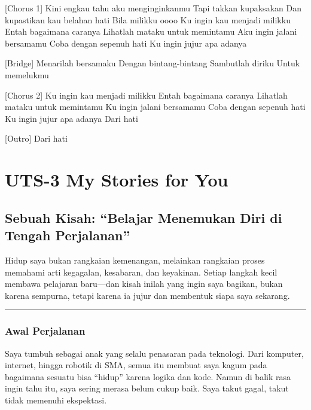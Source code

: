 \documentclass[
  letterpaper,
  DIV=11,
  numbers=noendperiod]{scrreprt}
\begin{document}
{[}Chorus 1{]} Kini engkau tahu aku menginginkanmu Tapi takkan
kupaksakan Dan kupastikan kau belahan hati Bila milikku oooo Ku ingin
kau menjadi milikku Entah bagaimana caranya Lihatlah mataku untuk
memintamu Aku ingin jalani bersamamu Coba dengan sepenuh hati Ku ingin
jujur apa adanya

{[}Bridge{]} Menarilah bersamaku Dengan bintang-bintang Sambutlah diriku
Untuk memelukmu

{[}Chorus 2{]} Ku ingin kau menjadi milikku Entah bagaimana caranya
Lihatlah mataku untuk memintamu Ku ingin jalani bersamamu Coba dengan
sepenuh hati Ku ingin jujur apa adanya Dari hati

{[}Outro{]} Dari hati


\chapter{UTS-3 My Stories for You}\label{uts-3-my-stories-for-you}

\section{\texorpdfstring{\textbf{Sebuah Kisah: ``Belajar Menemukan Diri
di Tengah
Perjalanan''}}{Sebuah Kisah: ``Belajar Menemukan Diri di Tengah Perjalanan''}}\label{sebuah-kisah-belajar-menemukan-diri-di-tengah-perjalanan}

Hidup saya bukan rangkaian kemenangan, melainkan rangkaian proses
memahami arti kegagalan, kesabaran, dan keyakinan. Setiap langkah kecil
membawa pelajaran baru---dan kisah inilah yang ingin saya bagikan, bukan
karena sempurna, tetapi karena ia jujur dan membentuk siapa saya
sekarang.

\begin{center}\rule{0.5\linewidth}{0.5pt}\end{center}

\subsection{\texorpdfstring{\textbf{Awal
Perjalanan}}{Awal Perjalanan}}\label{awal-perjalanan}

Saya tumbuh sebagai anak yang selalu penasaran pada teknologi. Dari
komputer, internet, hingga robotik di SMA, semua itu membuat saya kagum
pada bagaimana sesuatu bisa ``hidup'' karena logika dan kode. Namun di
balik rasa ingin tahu itu, saya sering merasa belum cukup baik. Saya
takut gagal, takut tidak memenuhi ekspektasi.
\end{document}
